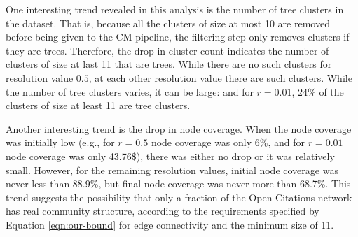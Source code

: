 \documentclass[11pt]{article}   	%
\begin{document}
One interesting trend revealed in this analysis is the number of tree clusters in the dataset. 
That is, because all the clusters of size at most 10 are removed before being given to the CM pipeline, the filtering
step only removes clusters if they are trees.
Therefore, the drop in cluster count indicates the number of clusters of size at last 11 that are trees.
While there are no such clusters for resolution value $0.5$, at each other resolution value there are such clusters.
While the number of tree clusters varies, it can be large: and for $r=0.01$, 24\% of the clusters of size at least 11 are tree clusters.
 
Another interesting trend is the drop in node coverage. 
When the node coverage was initially low (e.g., for $r=0.5$ node coverage was only 6\%, and for $r=0.01$ node coverage was only 43.76\$), there was either no drop or it was relatively small.
However, for the remaining resolution values, initial node coverage was never less than 88.9\%, but final node coverage was 
 never more than 68.7\%. 
 This trend suggests the possibility that only a fraction of the Open Citations network has real community structure, according to the
 requirements specified by Equation \ref{eqn:our-bound} for edge connectivity and the minimum size of 11.
\end{document}
